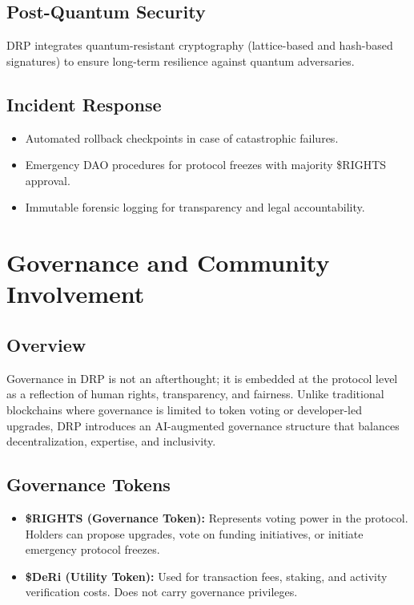 \documentclass[11pt,a4paper]{article}
\begin{document}
\subsection{Post-Quantum Security}
DRP integrates quantum-resistant cryptography (lattice-based and hash-based signatures) to ensure long-term resilience against quantum adversaries.  

\subsection{Incident Response}
\begin{itemize}
    \item Automated rollback checkpoints in case of catastrophic failures.  
    \item Emergency DAO procedures for protocol freezes with majority \$RIGHTS approval.  
    \item Immutable forensic logging for transparency and legal accountability.  
\end{itemize}

\section{Governance and Community Involvement}

\subsection{Overview}
Governance in DRP is not an afterthought; it is embedded at the protocol level as a reflection of human rights, transparency, and fairness. Unlike traditional blockchains where governance is limited to token voting or developer-led upgrades, DRP introduces an AI-augmented governance structure that balances decentralization, expertise, and inclusivity.

\subsection{Governance Tokens}
\begin{itemize}
    \item \textbf{\$RIGHTS (Governance Token):} Represents voting power in the protocol. Holders can propose upgrades, vote on funding initiatives, or initiate emergency protocol freezes.
    \item \textbf{\$DeRi (Utility Token):} Used for transaction fees, staking, and activity verification costs. Does not carry governance privileges.
\end{itemize}
\end{document}

